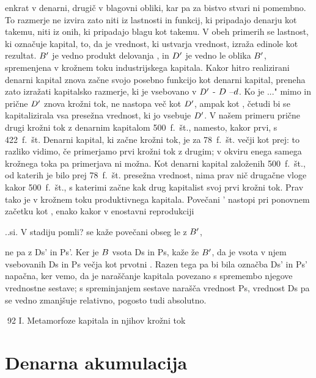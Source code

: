 \documentclass[kapital_02.tex]{subfiles}
\begin{document}
 enkrat v denarni, drugič v blagovni obliki, kar pa za bistvo stvari ni pomembno. To razmerje ne izvira zato niti iz lastnosti in funkcij, ki pripadajo denarju kot takemu, niti iz onih, ki pripadajo blagu kot takemu. V obeh primerih se lastnost, ki označuje kapital, to, da je vrednost, ki ustvarja vrednost, izraža edinole kot rezultat. \( B' \) je vedno produkt delovanja \KPEP, in \( D' \) je vedno le oblika \( B' \), spremenjena v krožnem toku industrijskega kapitala. Kakor hitro realizirani denarni kapital znova začne svojo posebno funkcijo kot denarni kapital, preneha zato izražati kapitalsko razmerje, ki je vsebovano v \( D' \) - \( D \) --\( d \). Ko je \KPED...\KPED" mimo in prične \( D' \) znova krožni tok, ne nastopa več kot \( D' \), ampak kot \KPED, četudi bi se kapitalizirala vsa presežna vrednost, ki jo vsebuje \( D' \). V našem primeru prične drugi krožni tok z denarnim kapitalom 500~f.~št., namesto, kakor prvi, s 422~f.~št. Denarni kapital, ki začne krožni tok, je za 78~f.~št. večji kot prej: to razliko vidimo, če primerjamo prvi krožni tok z drugim; v okviru enega samega krožnega toka pa primerjava ni možna. Kot denarni kapital založenih 500~f.~št., od katerih je bilo prej 78~f.~št. presežna vrednost, nima prav nič drugačne vloge kakor 500~f.~št., s katerimi začne kak drug kapitalist svoj prvi krožni tok. Prav tako je v krožnem toku produktivnega kapitala. Povečani \KPEP' nastopi pri ponovnem začetku kot \KPEP, enako kakor \KPEP v enostavni reprodukciji

\KPEP..si. V stadiju pomli? se kaže povečani obseg le z \( B' \),

ne pa z Ds' in Ps'. Ker je \( B \) vsota Ds in Ps, kaže že \( B' \), da je vsota v njem vsebovanih Ds in Ps večja kot prvotni \KPEP. Razen tega pa bi bila označba Ds' in Ps' napačna, ker vemo, da je naraščanje kapitala povezano s spremembo njegove vrednostne sestave; s spreminjanjem sestave narašča vrednost Ps, vrednost Ds pa se vedno zmanjšuje relativno, pogosto tudi absolutno.



92 I. Metamorfoze kapitala in njihov krožni tok



\section{Denarna akumulacija}
\end{document}
